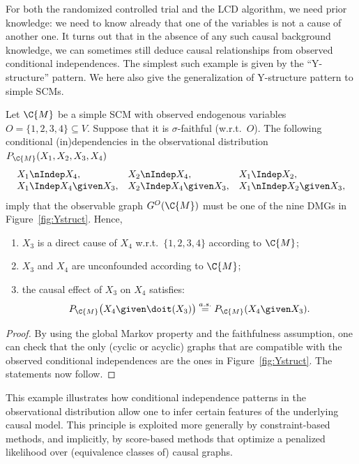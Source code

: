 For both the randomized controlled trial and the LCD algorithm, we need prior knowledge: we need to know already that one of the variables is not a cause of another one. 
It turns out that in the absence of any such causal background knowledge, we can sometimes still deduce causal relationships from observed conditional independences.
The simplest such example is given by the ``Y-structure'' pattern. %
We here also give the generalization of Y-structure pattern to simple SCMs.
\begin{Prp}
  Let $\C{M}$ be a simple SCM with observed endogenous variables $O = \{1,2,3,4\} \subseteq V$.
  Suppose that it is $\sigma$-faithful (w.r.t.\ $O$). 
  The following conditional (in)dependencies in the observational distribution $P_{\C{M}}(X_1,X_2,X_3,X_4)$
  $$\begin{array}{lll}
    X_1 \nIndep X_4,  & X_2 \nIndep X_4, & X_1 \Indep X_2, \\
    X_1 \Indep X_4 \given X_3, & X_2 \Indep X_4 \given X_3, & X_1 \nIndep X_2 \given X_3,
  \end{array}$$
  imply that the observable graph $G^O(\C{M})$ must be one of the nine DMGs in Figure~\ref{fig:Ystruct}.
  Hence,
  \begin{enumerate}
    \item $X_3$ is a direct cause of $X_4$ w.r.t.\ $\{1,2,3,4\}$ according to $\C{M}$;
    \item $X_3$ and $X_4$ are unconfounded according to $\C{M}$;
    \item the causal effect of $X_3$ on $X_4$ satisfies:
  \begin{equation}\label{eq:Y_causal_effect}
    P_{\C{M}}\big(X_4 \given \doit(X_3)\big) \stackrel{a.s.}{=} P_{\C{M}}(X_4 \given X_3).
  \end{equation}
  \end{enumerate}
\end{Prp}
\begin{proof}
By using the global Markov property and the faithfulness assumption, one
can check that the only (cyclic or acyclic) graphs that are compatible with the observed
conditional independences are the ones in Figure~\ref{fig:Ystruct}.
The statements now follow.
\end{proof}
This example illustrates how conditional independence patterns in the observational
distribution allow one to infer certain features of the underlying causal model. This
principle is exploited more generally by constraint-based methods, and implicitly,
by score-based methods that optimize a penalized likelihood over (equivalence classes of) causal graphs.

